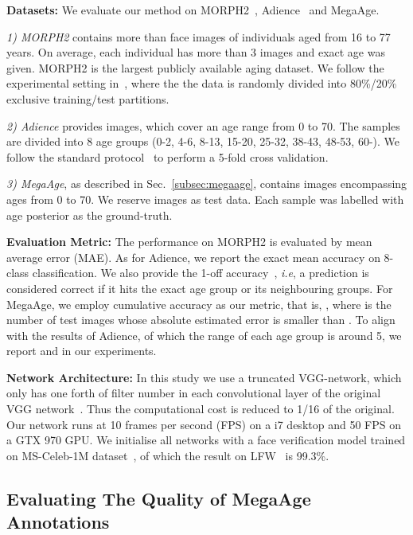 \documentclass{bmvc2k}
\def\ie{\emph{i.e}\bmvaOneDot}
\begin{document}
\noindent
\textbf{Datasets:} We evaluate our method on MORPH2~\cite{ricanek2006morph}, Adience~\cite{eidinger2014age} and MegaAge.

\noindent
\textsl{1) MORPH2} contains more than  face images of  individuals aged from 16 to 77 years. On average, each individual has more than 3 images and exact age was given. MORPH2 is the largest publicly available aging dataset. We follow the experimental setting in~\cite{niu2016ordinal}, where the the data is randomly divided into 80\%/20\% exclusive  training/test partitions.

\noindent
\textsl{2) Adience} provides  images, which cover an age range from 0 to 70. The samples are divided into 8 age groups (0-2, 4-6, 8-13, 15-20, 25-32, 38-43, 48-53, 60-). We follow the standard protocol~\cite{eidinger2014age} to perform a 5-fold cross validation. 

\noindent
\textsl{3) MegaAge}, as described in Sec.~\ref{subsec:megaage}, contains  images encompassing ages from 0 to 70. We reserve  images as test data. Each sample was labelled with age posterior as the ground-truth.

\noindent
\textbf{Evaluation Metric:} 
The performance on MORPH2 is evaluated by mean average error (MAE). As for Adience, we report the exact mean accuracy on 8-class classification. We also provide the 1-off accuracy~\cite{eidinger2014age}, \ie, a prediction is considered correct if it hits the exact age group or its neighbouring groups.
For MegaAge, we employ cumulative accuracy as our metric, that is, , where  is the number of test images whose absolute estimated error is smaller than . To align with the results of Adience, of which the range of each age group is around 5, we report  and  in our experiments. 





\noindent
\textbf{Network Architecture:} 
In this study we use a truncated VGG-network, which only has one forth of filter number in each convolutional layer of the original VGG network~\cite{simonyan2014very}. Thus the computational cost is reduced to 1/16 of the original. Our network runs at 10 frames per second (FPS) on a i7 desktop and 50 FPS on a GTX 970 GPU. We initialise all networks with a face verification model trained on MS-Celeb-1M dataset~\cite{guo2016ms}, of which the result on LFW~\cite{huang2007labeled} is 99.3\%.



\subsection{Evaluating The Quality of MegaAge Annotations}
\end{document}
